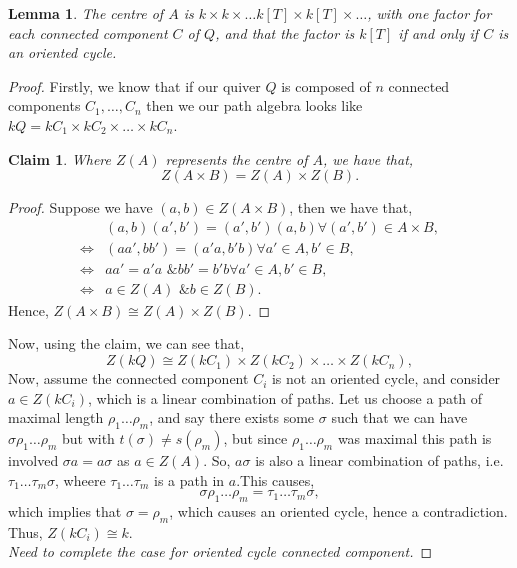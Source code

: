 \documentclass[11.5pt, twoside, a4paper, titlepage]{report}
\providecommand{\equ}[0]{\begin{equation*}}
\providecommand{\eequ}[0] {\end{equation*}}
\theoremstyle{definition}
\theoremstyle{plain}
\newtheorem{lem}[mydef]{Lemma}
\newtheorem*{claim}{Claim}
\begin{document}
\begin{lem}
The centre of $A$ is $k\times k\times \dots k[T] \times k[T] \times \dots$, with one factor for each connected component $C$ of $Q$, and that the factor is $k[T]$ if and only if $C$ is an oriented cycle.
\end{lem}
\begin{proof}
Firstly, we know that if our quiver $Q$ is composed of $n$ connected components $C_1, \dots, C_n$ then we our path algebra looks like $kQ=kC_1 \times kC_2 \times \dots \times kC_n$.
\begin{claim}
Where $Z(A)$ represents the centre of $A$, we have that, 
\equ
Z(A\times B)=Z(A) \times Z(B).
\eequ
\end{claim}
\begin{proof}
Suppose we have $(a, b)\in Z(A \times B)$, then we have that,
\begin{align*}
& (a, b)(a', b')=(a', b')(a, b) \forall (a',b')\in A\times B,\\
\Leftrightarrow &(aa',bb')=(a'a,b'b) \forall a'\in A, b' \in B, \\
\Leftrightarrow & aa'=a'a \text{ \& } bb'=b'b \forall a'\in A, b'\in B,\\
\Leftrightarrow & a\in Z(A) \text{ \& } b\in Z(B).
\end{align*}
Hence, $Z(A \times B)\cong Z(A) \times Z(B)$.
\end{proof}
Now, using the claim, we can see that,
\equ
Z(kQ) \cong Z(kC_1) \times Z(kC_2) \times \dots \times Z(kC_n),
\eequ
Now, assume the connected component $C_i$ is not an oriented cycle, and consider $a\in Z(kC_i)$, which is a linear combination of paths. Let us choose a path of maximal length $\rho_1\dots \rho_m$, and say there exists some $\sigma$ such that we can have $\sigma \rho_1 \dots \rho_m$ but with $t(\sigma)\neq s(\rho_m)$, but since $\rho_1 \dots \rho_m$ was maximal this path is involved $\sigma a=a\sigma$ as $a\in Z(A)$. So, $a \sigma$ is also a linear combination of paths, i.e. $\tau_1 \dots \tau_m\sigma$, wheere $\tau_1\dots\tau_m$ is a path in $a$.This causes, 
\equ
\sigma\rho_1\dots\rho_m=\tau_1\dots\tau_m\sigma,
\eequ
which implies that $\sigma=\rho_m$, which causes an oriented cycle, hence a contradiction. Thus, $Z(kC_i)\cong k$.\\
\emph{Need to complete the case for oriented cycle connected component.}

\end{proof}
\end{document}
